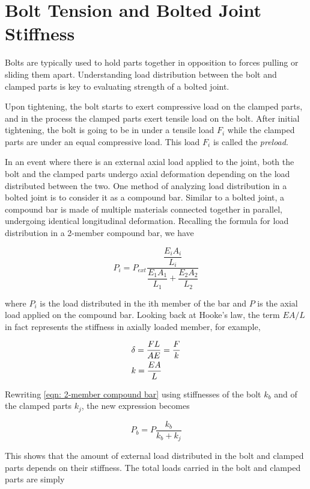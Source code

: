 \documentclass[a4paper,openany,12pt]{book}
\begin{document}
{{\section{Bolt Tension and Bolted Joint Stiffness}
\label{bolt-tension-and-bolted-joint-stiffness}
Bolts are typically used to hold parts together in opposition to forces
pulling or sliding them apart. Understanding load distribution between
the bolt and clamped parts is key to evaluating strength of a bolted
joint.

Upon tightening, the bolt starts to exert compressive load on the
clamped parts, and in the process the clamped parts exert tensile load
on the bolt. After initial tightening, the bolt is going to be in under
a tensile load \(F_i\) while the clamped parts are under an equal
compressive load. This load \(F_i\) is called the \emph{preload}.

In an event where there is an external axial load applied to the joint,
both the bolt and the clamped parts undergo axial deformation depending
on the load distributed between the two. One method of analyzing load
distribution in a bolted joint is to consider it as a compound bar.
Similar to a bolted joint, a compound bar is made of multiple materials
connected together in parallel, undergoing identical longitudinal
deformation. Recalling the formula for load distribution in a 2-member
compound bar, we have

$$ P_i = P_{ext}\frac{\dfrac{E_iA_i}{L_i}}{\dfrac{E_1A_1}{L_1} + \dfrac{E_2A_2}{L_2}}$$

where \(P_i\) is the load distributed in the ith member of the bar and \(P\)
is the axial load applied on the compound bar. Looking back at Hooke's
law, the term \(EA/L\) in fact represents the stiffness in axially loaded
member, for example,

$$\begin{gathered}
  \delta  = \frac{FL}{AE} = \frac{F}{k} \hfill \\
  k = \frac{EA}{L} \hfill \\ 
\end{gathered}$$

Rewriting \ref{eqn: 2-member compound bar}
using stiffnesses of the bolt \(k_b\) and of the clamped parts \(k_j\), the
new expression becomes


$$P_b = P\frac{k_b}{k_b + k_j}$$

This shows that the amount of external load distributed in the bolt and
clamped parts depends on their stiffness. The total loads carried in the
bolt and clamped parts are simply


}}
\end{document}
